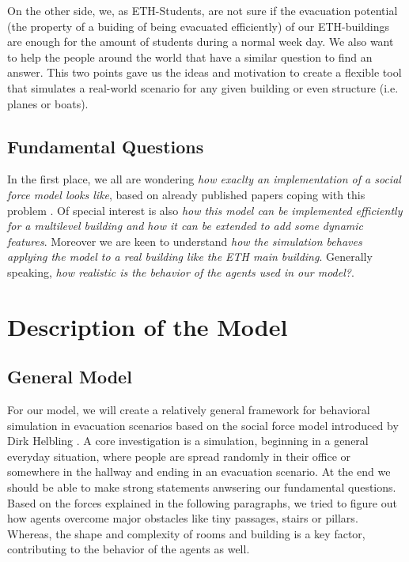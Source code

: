 \documentclass[11pt]{article}
\begin{document}
On the other side, we, as ETH-Students, are not sure if the evacuation potential
(the property of a buiding of being evacuated efficiently) of our ETH-buildings
are enough for the amount of students during a normal week day. We also want to
help the people around the world that have a similar question to find an answer.
This two points gave us the ideas and motivation to create a flexible tool that
simulates a real-world scenario for any given building or even structure (i.e.
planes or boats).


\subsection{Fundamental Questions}

In the first place, we all are wondering \textit{how exaclty an implementation
of a social force model looks like}, based on already published papers coping
with this problem \cite{SFMPD} \cite{SDFEP}. Of special interest is also
\textit{how this model can be implemented efficiently for a multilevel building
and how it can be extended to add some dynamic features}. Moreover we are keen
to understand \textit{how the simulation behaves applying the model to a real
building like the ETH main building}. Generally speaking, \textit{how realistic
is the behavior of the agents used in our model?}.

\section{Description of the Model}
\subsection{General Model}

For our model, we will create a relatively general framework for behavioral
simulation in evacuation scenarios based on the social force model introduced by Dirk Helbling \cite{SDFEP}.
A core investigation is a simulation, beginning in a general everyday situation,
where people are spread randomly in their office or somewhere in the hallway and ending in an evacuation scenario.
At the end we should be able to make strong
statements anwsering our fundamental questions.
Based on the forces explained in the following paragraphs, we tried to figure
out how agents overcome major obstacles like tiny passages, stairs or pillars. Whereas, the
shape and complexity of rooms and building is a key factor, contributing to the behavior of the
agents as well. %
\end{document}
